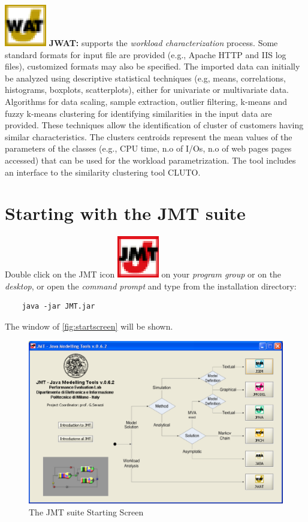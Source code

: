 \medskip \noindent \includegraphics[scale=.5]{img/JWATIcon}
\textbf{JWAT:} supports the \emph{workload characterization}
process. Some standard formats for input file are provided (e.g.,
Apache HTTP and IIS log files), customized formats may also be
specified. The imported data can initially be analyzed using
descriptive statistical techniques (e.g, means, correlations,
histograms, boxplots, scatterplots), either for univariate or
multivariate data. Algorithms for data scaling, sample extraction,
outlier filtering, k-means and fuzzy k-means clustering for
identifying similarities in the input data are provided. These
techniques allow the identification of cluster of customers having
similar characteristics. The clusters centroids represent the mean
values of the parameters of the classes (e.g., CPU time, n.o of
I/Os, n.o of web pages pages accessed) that can be used for the
workload parametrization. The tool includes an interface to the
similarity clustering tool CLUTO.

\section{Starting with the JMT suite}
Double click on the JMT icon
\includegraphics[scale=.5]{img/JMTIcon} on your \emph{program group} or
on the \emph{desktop}, or open the \emph{command prompt} and type
from the installation directory:
\begin{verbatim}
    java -jar JMT.jar
\end{verbatim}
The window of \autoref{fig:startscreen} will be shown.

\begin{figure}[htbp]
    \begin{center}
        \includegraphics[scale=.5]{img/StartScreen}
    \end{center}
    \caption{The JMT suite Starting Screen}
    \label{fig:startscreen}
\end{figure}

